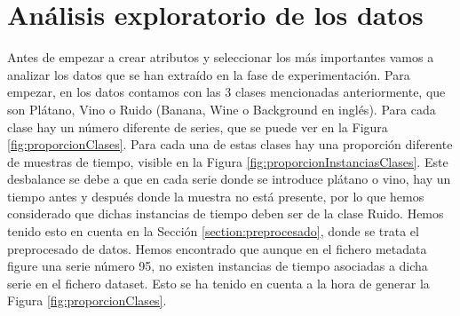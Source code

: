 \documentclass{esannV2}
\begin{document}
\section{Análisis exploratorio de los datos}\label{section:analisisDatos}

Antes de empezar a crear atributos y seleccionar los más importantes vamos a analizar los datos que se han extraído en la fase de experimentación. Para empezar, en los datos contamos con las 3 clases mencionadas anteriormente, que son Plátano, Vino o Ruido (Banana, Wine o Background en inglés).
\newline\newline
Para cada clase hay un número diferente de series, que se puede ver en la Figura \ref{fig:proporcionClases}. Para cada una de estas clases hay una proporción diferente de muestras de tiempo, visible en la Figura \ref{fig:proporcionInstanciasClases}. Este desbalance se debe a que en cada serie donde se introduce plátano o vino, hay un tiempo antes y después donde la muestra no está presente, por lo que hemos considerado que dichas instancias de tiempo deben ser de la clase Ruido. Hemos tenido esto en cuenta en la Sección \ref{section:preprocesado}, donde se trata el preprocesado de datos.
\newline\newline
Hemos encontrado que aunque en el fichero metadata figure una serie número 95, no existen instancias de tiempo asociadas a dicha serie en el fichero dataset. Esto se ha tenido en cuenta a la hora de generar la Figura \ref{fig:proporcionClases}.\\
\end{document}
